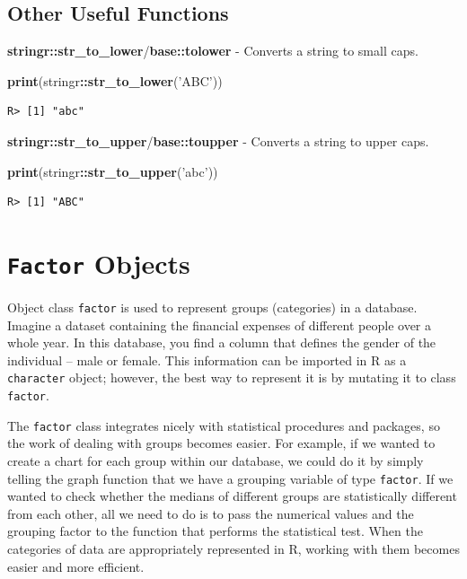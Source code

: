 \documentclass[
  12pt,
]{book}
\newenvironment{Shaded}{\begin{snugshade}}{\end{snugshade}}
\newcommand{\KeywordTok}[1]{\textcolor[rgb]{0.27,0.27,0.27}{\textbf{#1}}}
\newcommand{\NormalTok}[1]{#1}
\newcommand{\OperatorTok}[1]{\textcolor[rgb]{0.43,0.43,0.43}{\textbf{#1}}}
\newcommand{\StringTok}[1]{\textcolor[rgb]{0.5,0.5,0.5}{#1}}
\begin{document}
\hypertarget{other-useful-functions-3}{%
\subsection{Other Useful Functions}\label{other-useful-functions-3}}

\textbf{stringr::str\_to\_lower}/\textbf{base::tolower} - Converts a string to small caps.

\begin{Shaded}
\begin{Highlighting}[]
\KeywordTok{print}\NormalTok{(stringr}\OperatorTok{::}\KeywordTok{str_to_lower}\NormalTok{(}\StringTok{'ABC'}\NormalTok{))}
\end{Highlighting}
\end{Shaded}

\begin{verbatim}
R> [1] "abc"
\end{verbatim}

\textbf{stringr::str\_to\_upper}/\textbf{base::toupper} - Converts a string to upper caps.

\begin{Shaded}
\begin{Highlighting}[]
\KeywordTok{print}\NormalTok{(stringr}\OperatorTok{::}\KeywordTok{str_to_upper}\NormalTok{(}\StringTok{'abc'}\NormalTok{))}
\end{Highlighting}
\end{Shaded}

\begin{verbatim}
R> [1] "ABC"
\end{verbatim}

\hypertarget{factor-objects}{%
\section{\texorpdfstring{\texttt{Factor} Objects}{Factor Objects}}\label{factor-objects}}

Object class \texttt{factor} is used to represent groups (categories) in a database. Imagine a dataset containing the financial expenses of different people over a whole year. In this database, you find a column that defines the gender of the individual -- male or female. This information can be imported in R as a \texttt{character} object; however, the best way to represent it is by mutating it to class \texttt{factor}.

The \texttt{factor} class integrates nicely with statistical procedures and packages, so the work of dealing with groups becomes easier. For example, if we wanted to create a chart for each group within our database, we could do it by simply telling the graph function that we have a grouping variable of type \texttt{factor}. If we wanted to check whether the medians of different groups are statistically different from each other, all we need to do is to pass the numerical values and the grouping factor to the function that performs the statistical test. When the categories of data are appropriately represented in R, working with them becomes easier and more efficient.
\end{document}

